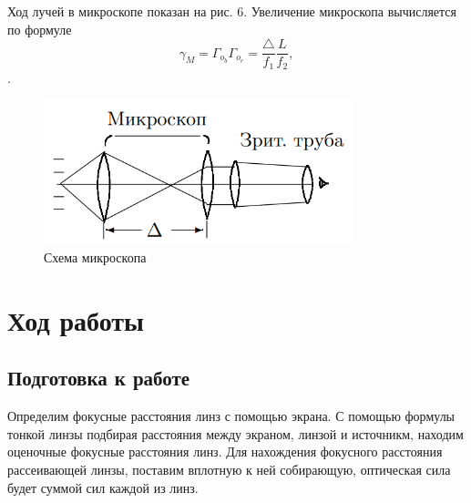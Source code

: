\documentclass[a4paper,12pt]{article}
\theoremstyle{definition}
\begin{document}
Ход лучей в микроскопе показан на рис. 6. Увеличение микроскопа вычисляется по формуле
    \begin{equation}
        \gamma_M = \Gamma_{o_b} \Gamma_{o_c} = \frac{\triangle}{f_1} \frac{L}{f_2},
    \end{equation}.

    \begin{figure}[h]
    \centering
    \includegraphics[width=9cm]{micro_2.PNG}
    \caption{Схема микроскопа}
    \label{fig:vac}
\end{figure}


\newpage
\section{Ход работы}
\subsection{Подготовка к работе}
\par Определим фокусные расстояния линз с помощью экрана. С помощью формулы тонкой линзы подбирая расстояния между экраном, линзой и источникм, находим оценочные фокусные расстояния линз. Для нахождения фокусного расстояния рассеивающей линзы, поставим вплотную к ней собирающую, оптическая сила будет суммой сил каждой из линз. %

\end{document}
